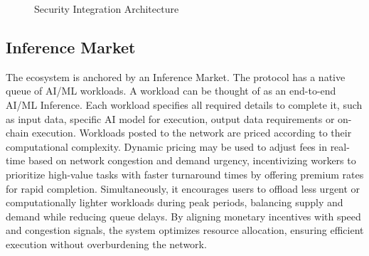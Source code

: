 \documentclass[conference]{IEEEtran}
\begin{document}
\begin{figure}[htbp]
    \centering
    \caption{Security Integration Architecture}
    \label{fig:security-arch}
\end{figure}

\subsection{Inference Market}

The ecosystem is anchored by an Inference Market. The protocol has a native queue of AI/ML workloads. A workload can be thought of as an end-to-end AI/ML Inference.
Each workload specifies all required details to complete it, such as input data, specific AI model for execution, output data requirements or on-chain execution.
Workloads posted to the network are priced according to their computational complexity.
Dynamic pricing may be used to adjust fees in real-time based on network congestion and demand urgency, incentivizing workers to prioritize high-value tasks with faster turnaround times by offering premium rates for rapid completion.
Simultaneously, it encourages users to offload less urgent or computationally lighter workloads during peak periods, balancing supply and demand while reducing queue delays.
By aligning monetary incentives with speed and congestion signals, the system optimizes resource allocation, ensuring efficient execution without overburdening the network.
\end{document}

